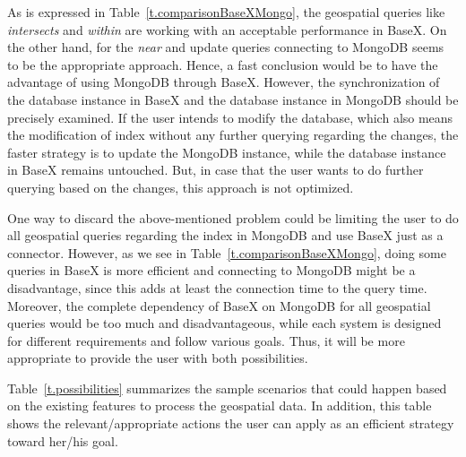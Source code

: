 \documentclass[a4paper,12pt]{article}
\begin{document}
As is expressed in Table~\ref{t.comparisonBaseXMongo}, the geospatial queries like \textit{intersects} and \textit{within} are working with an acceptable performance in BaseX. On the other hand, for the \textit{near} and update queries connecting to MongoDB seems to be the appropriate approach. Hence, a fast conclusion would be to have the advantage of using MongoDB through BaseX. However, the synchronization of the database instance in BaseX and the database instance in MongoDB should be precisely examined. If the user intends to modify the database, which also means the modification of index without any further querying regarding the changes, the faster strategy is to update the MongoDB instance, while the database instance in BaseX remains untouched. But, in case that the user wants to do further querying based on the changes, this approach is not optimized.  

One way to discard the above-mentioned problem could be limiting the user to do all geospatial queries regarding the index in MongoDB and use BaseX just as a connector. 
However, as we see in Table~\ref{t.comparisonBaseXMongo}, doing some queries in BaseX is more efficient and connecting to MongoDB might be a disadvantage, since this adds at least the connection time to the query time. Moreover, the complete dependency of BaseX on MongoDB for all geospatial queries would be too much and disadvantageous, while each system is designed for different requirements and follow various goals. 
Thus, it will be more appropriate to provide the user with both possibilities.

Table~\ref{t.possibilities} summarizes the sample scenarios that could happen based on the existing features to process the geospatial data. In addition, this table shows the relevant\-/appropriate actions the user can apply as an efficient strategy toward her\-/his goal.


\begin{table}
\centering
{}
\caption{Possible scenarios and appropriate actions suggested to take}
\label{t.possibilities}
\end{table}
\end{document}
